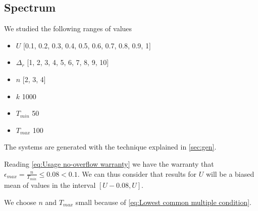 \subsection{Spectrum}

We studied the following ranges of values
\begin{itemize}
	\item{$U$} [0.1, 0.2, 0.3, 0.4, 0.5, 0.6, 0.7, 0.8, 0.9, 1]
	\item{$\Delta_r$} [1, 2, 3, 4, 5, 6, 7, 8, 9, 10]
	\item{$n$} [2, 3, 4]
	\item{$k$} 1000
	\item{$T_{min}$} 50
	\item{$T_{max}$} 100
\end{itemize}

The systems are generated with the technique explained in \ref{sec:gen}.

Reading \ref{eq:Usage no-overflow warranty} we have the warranty that $\epsilon_{max} = \frac{n}{T_{min}} \leq 0.08 < 0.1$.
We can thus consider that results for $U$ will be a biased mean of values in the interval $[U-0.08, U]$.

We choose $n$ and $T_{max}$ small because of \ref{eq:Lowest common multiple condition}.


